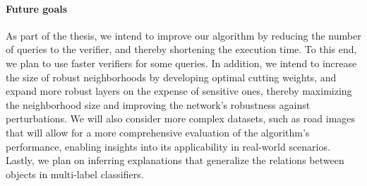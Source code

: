 \paragraph{Future goals}
As part of the thesis, we intend to improve our algorithm by reducing the number of queries to the verifier, and thereby shortening the execution time.
To this end, we plan to use faster verifiers for some queries. %
In addition, we intend to increase the size of robust neighborhoods by developing optimal cutting weights, and expand more robust layers on the expense of sensitive ones, thereby maximizing the neighborhood size and improving the network's robustness against perturbations.
We will also consider more complex datasets, such as road images that will allow for a more comprehensive evaluation of the algorithm's performance, enabling insights into its applicability in real-world scenarios.
Lastly, we plan on inferring explanations that generalize the relations between objects in multi-label classifiers.

%
%
